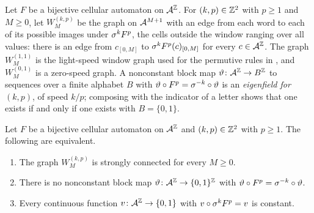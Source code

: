 Let $F$ be a bijective cellular automaton on $\mathcal{A}^{\mathbb{Z}}$. For $(k,p)\in\mathbb{Z}^2$ with $p\ge1$ and $M\ge0$, let $W^{(k,p)}_M$ be the graph on $\mathcal{A}^{M+1}$ with an edge from each word to each of its possible images under $\sigma^kF^p$, the cells outside the window ranging over all values: there is an edge from $c_{[0,M]}$ to $\sigma^kF^p(c)_{[0,M]}$ for every $c\in\mathcal{A}^{\mathbb{Z}}$. The graph $W^{(1,1)}_M$ is the light-speed window graph used for the permutive rules in \cite{PaperB}, and $W^{(0,1)}_M$ is a zero-speed graph. A nonconstant block map $\vartheta\colon\mathcal{A}^{\mathbb{Z}}\to B^{\mathbb{Z}}$ to sequences over a finite alphabet $B$ with $\vartheta\circ F^p=\sigma^{-k}\circ\vartheta$ is an \emph{eigenfield for $(k,p)$}, of speed $k/p$; composing with the indicator of a letter shows that one exists if and only if one exists with $B=\{0,1\}$.

\begin{lemma}\label{cl:lem:eigen}
Let $F$ be a bijective cellular automaton on $\mathcal{A}^{\mathbb{Z}}$ and $(k,p)\in\mathbb{Z}^2$ with $p\ge1$. The following are equivalent.
\begin{enumerate}
\item[(1)] The graph $W^{(k,p)}_M$ is strongly connected for every $M\ge0$.
\item[(2)] There is no nonconstant block map $\vartheta\colon\mathcal{A}^{\mathbb{Z}}\to\{0,1\}^{\mathbb{Z}}$ with $\vartheta\circ F^p=\sigma^{-k}\circ\vartheta$.
\item[(3)] Every continuous function $v\colon\mathcal{A}^{\mathbb{Z}}\to\{0,1\}$ with $v\circ\sigma^kF^p=v$ is constant.
\end{enumerate}
\end{lemma}

